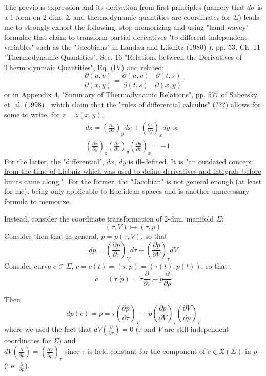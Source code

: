 \documentclass[10pt]{amsart}
\begin{document}
\begin{multicols*}{2}
The previous expression and its derivation from first principles (namely that $d\sigma$ is a 1-form on 2-dim. $\Sigma$ and thermodynamic quantities are coordinates for $\Sigma$) leads me to strongly exhort the following: stop memorizing and using "hand-wavey" formulae that claim to transform partial derivatives "to different independent variables" such as the "Jacobians" in Landau and Lifshitz (1980) \cite{LLandauELifshitz1980}), pp. 53, Ch. 11 "Thermodynamic Quantities", Sec. 16 "Relations between the Derivatives of Thermodynmaic Quantities", Eq. (IV) and related:
\[
\frac{ \partial (u,v)}{ \partial (x,y)} = \frac{ \partial (u,v) }{ \partial (t,s)} \cdot \frac{\partial (t,s) }{ \partial (x,y) }
\]
or in Appendix 4, "Summary of Thermodynamic Relations", pp. 577 of Sabersky, et. al. (1998) \cite{SAHG1998}, which claim that the "rules of differential calculus" (???) allows for some to write, for $z = z(x,y)$, 
\[
\begin{gathered} 
dz = \left( \frac{ \partial z}{ \partial x} \right)_y dx + \left( \frac{ \partial z}{ \partial y} \right)_x dy \text{ or } \\
\left( \frac{ \partial x }{ \partial y} \right)_z \left( \frac{ \partial z }{ \partial x} \right)_y \left( \frac{ \partial y}{ \partial z }\right)_x = -1
\end{gathered}
\]
For the latter, the "differential", $dx$, $dy$ is ill-defined. It is \href{https://math.stackexchange.com/questions/2101896/what-is-the-meaning-of-a-differential-in-terms-of-an-exact-differential}{"an outdated concept from the time of Liebniz which was used to define derivatives and integrals before limits came along."}. For the former, the "Jacobian" is not general enough (at least for me), being only applicable to Euclidean spaces and is another unnecessary formula to memorize.

Instead, consider the coordinate transformation of 2-dim. manifold $\Sigma$:
\[
(\tau, V) \mapsto (\tau, p)
\]
Consider then that in general, $p = p(\tau, V)$, so that 
\[
dp = \left( \frac{ \partial p }{ \partial \tau} \right)_V d\tau + \left( \frac{ \partial p }{ \partial V} \right)_{\tau} dV
\]
Consider curve $c\subset \Sigma$, $c=c(t) = (\tau, p) = (\tau(t), p(t))$, so that 
\[
\dot{c} = ( \dot{\tau}, \dot{p}) = \dot{\tau} \frac{ \partial }{ \partial \tau } + \dot{p} \frac{ \partial }{ \partial p}
\]

Then
\begin{equation}\label{Eq:CoordinateTransformationOfPressurep}
dp(\dot{c}) = \dot{p} = \dot{\tau} \left( \frac{ \partial p }{ \partial \tau} \right)_V + \dot{p} \left( \frac{\partial p}{ \partial V}\right)_{\tau}  \left( \frac{ \partial V}{ \partial p } \right)_{\tau}
\end{equation}
where we used the fact that $dV \left( \frac{ \partial }{ \partial \tau } \right) = 0 $ ($\tau$ and $V$ are still independent coordinates for $\Sigma$) and \\
$dV\left( \frac{ \partial }{ \partial p} \right) = \left( \frac{ \partial V}{ \partial p } \right)_{\tau}$ since $\tau$ is held constant for the component of $\dot{c} \in \mathfrak{X}(\Sigma)$ in $p$ (i.e. $\frac{\partial }{ \partial p}$).


\end{multicols*}
\end{document}
